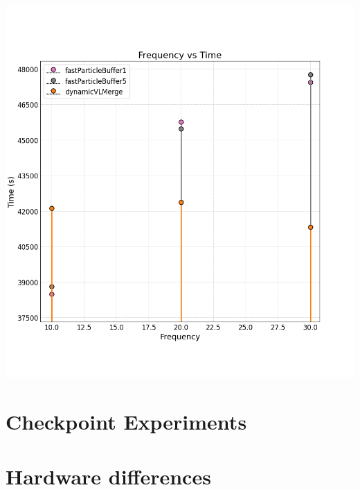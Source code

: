 \begin{center}
\includegraphics[width=0.6\linewidth]{graphs/spinodalDecomposition/vlcc08_increased.png}
\end{center}


\section{Checkpoint Experiments}

\section{Hardware differences}

